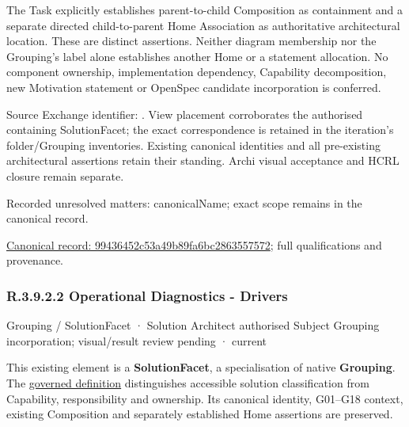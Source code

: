 The Task explicitly establishes parent-to-child Composition as containment and
a separate directed child-to-parent Home Association as authoritative architectural
location. These are distinct assertions. Neither diagram membership nor the
Grouping's label alone establishes another Home or a statement allocation.
No component ownership, implementation dependency, Capability decomposition,
new Motivation statement or OpenSpec candidate incorporation is conferred.



Source Exchange identifier: \texttt{}. View placement corroborates
the authorised containing SolutionFacet; the exact correspondence is retained in the
iteration's folder/Grouping inventories. Existing canonical identities and all
pre-existing architectural assertions retain their standing. Archi visual
acceptance and HCRL closure remain separate.


{\small Recorded unresolved matters: canonicalName; exact scope remains in the canonical record.}\par
{\footnotesize \href{../../../../../../../continuum/grouping/99436452c53a49b89fa6bc2863557572.md}{Canonical record: 99436452c53a49b89fa6bc2863557572}; full qualifications and provenance.}\par
\subsubsection*{R.3.9.2.2 Operational Diagnostics - Drivers}
\label{navigation:R.3.9.2.2}

\label{element:805280b737e14b72ba401393c1f4a271}
{\small Grouping / SolutionFacet · Solution Architect authorised Subject Grouping incorporation; visual/result review pending · current}\par

This existing element is a \textbf{SolutionFacet}, a specialisation of native
\textbf{Grouping}. The \href{\detokenize{../../../../../../../governance/continuum-representation.md#solutionfacet-classification--1119-candidate}}{governed definition}
distinguishes accessible solution classification from Capability, responsibility
and ownership. Its canonical identity, G01–G18 context, existing Composition
and separately established Home assertions are preserved.



